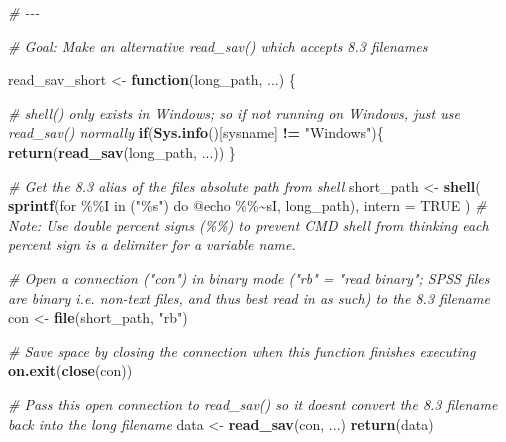 \documentclass[
]{article}
\newenvironment{Shaded}{\begin{snugshade}}{\end{snugshade}}
\newcommand{\AttributeTok}[1]{\textcolor[rgb]{0.13,0.29,0.53}{#1}}
\newcommand{\CommentTok}[1]{\textcolor[rgb]{0.56,0.35,0.01}{\textit{#1}}}
\newcommand{\ConstantTok}[1]{\textcolor[rgb]{0.56,0.35,0.01}{#1}}
\newcommand{\ControlFlowTok}[1]{\textcolor[rgb]{0.13,0.29,0.53}{\textbf{#1}}}
\newcommand{\FunctionTok}[1]{\textcolor[rgb]{0.13,0.29,0.53}{\textbf{#1}}}
\newcommand{\NormalTok}[1]{#1}
\newcommand{\OtherTok}[1]{\textcolor[rgb]{0.56,0.35,0.01}{#1}}
\newcommand{\SpecialCharTok}[1]{\textcolor[rgb]{0.81,0.36,0.00}{\textbf{#1}}}
\newcommand{\StringTok}[1]{\textcolor[rgb]{0.31,0.60,0.02}{#1}}
\begin{document}
\begin{Shaded}
\begin{Highlighting}[]
\CommentTok{\# {-}{-}{-}}

\CommentTok{\# Goal: Make an alternative read\_sav() which accepts 8.3 filenames}

\NormalTok{read\_sav\_short }\OtherTok{\textless{}{-}} \ControlFlowTok{function}\NormalTok{(long\_path, ...) \{}
  
  \CommentTok{\# shell() only exists in Windows; so if not running on Windows, just use read\_sav() normally}
  \ControlFlowTok{if}\NormalTok{(}\FunctionTok{Sys.info}\NormalTok{()[}\StringTok{\textquotesingle{}sysname\textquotesingle{}}\NormalTok{] }\SpecialCharTok{!=} \StringTok{"Windows"}\NormalTok{)\{}
    \FunctionTok{return}\NormalTok{(}\FunctionTok{read\_sav}\NormalTok{(long\_path, ...))}
\NormalTok{  \}}
  
  \CommentTok{\# Get the 8.3 alias of the file\textquotesingle{}s absolute path from shell}
\NormalTok{  short\_path }\OtherTok{\textless{}{-}} \FunctionTok{shell}\NormalTok{(}
    \FunctionTok{sprintf}\NormalTok{(}\StringTok{\textquotesingle{}for \%\%I in ("\%s") do @echo \%\%\textasciitilde{}sI\textquotesingle{}}\NormalTok{, long\_path), }
    \AttributeTok{intern =} \ConstantTok{TRUE}
\NormalTok{    ) }\CommentTok{\# Note: Use double percent signs (\%\%) to prevent CMD shell from thinking each percent sign is a delimiter for a variable name.}
 
  \CommentTok{\# Open a connection ("con") in binary mode ("rb" = "read binary"; SPSS files are binary i.e. non{-}text files, and thus best read in as such) to the 8.3 filename}
\NormalTok{  con }\OtherTok{\textless{}{-}} \FunctionTok{file}\NormalTok{(short\_path, }\StringTok{"rb"}\NormalTok{)}
  
  \CommentTok{\# Save space by closing the connection when this function finishes executing}
  \FunctionTok{on.exit}\NormalTok{(}\FunctionTok{close}\NormalTok{(con))}
  
  \CommentTok{\# Pass this open connection to read\_sav() so it doesn\textquotesingle{}t convert the 8.3 filename back into the long filename}
\NormalTok{  data }\OtherTok{\textless{}{-}} \FunctionTok{read\_sav}\NormalTok{(con, ...)}
  \FunctionTok{return}\NormalTok{(data)}
  

\end{Highlighting}
\end{Shaded}
\end{document}
